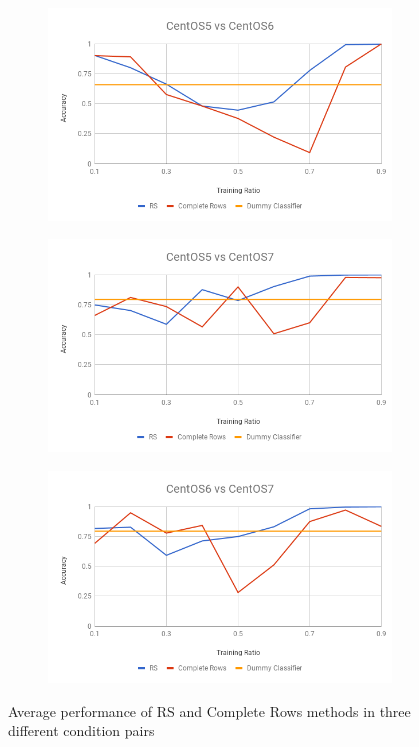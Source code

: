 \documentclass[10pt, conference, compsocconf]{IEEEtran}
\begin{document}
\begin{figure}[h!]
        \centering
        \begin{subfigure}[b]{0.4\linewidth}
                \includegraphics[width=\columnwidth]{figures/RS_Rows_5vs6}
        \end{subfigure}
        \begin{subfigure}[b]{0.4\linewidth}
                \includegraphics[width=\columnwidth]{figures/RS_Rows_5vs7}
        \end{subfigure}
        \begin{subfigure}[b]{0.4\linewidth}
                \includegraphics[width=\columnwidth]{figures/RS_Rows_6vs7}
        \end{subfigure}
        \caption{Average performance of RS and Complete Rows methods in three different condition pairs}
        \label{fig:RS_RowS}
\end{figure}
\end{document}

